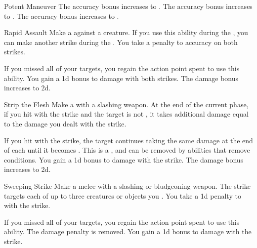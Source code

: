{\begin{ability}{Potent Maneuver}
                \rankline
                 The accuracy bonus increases to .
                 The accuracy bonus increases to .
                 The accuracy bonus increases to .
            \end{ability}

            \begin{ability}{Rapid Assault}
                Make a  against a creature.
                If you use this ability during the , you can make another strike during the .
                You take a  penalty to accuracy on both strikes.

                \rankline
                 If you missed all of your targets, you regain the action point spent to use this ability.
                 You gain a \plus1d bonus to damage with both strikes.
                 The damage bonus increases to \plus2d.
            \end{ability}

            \begin{ability}{Strip the Flesh}
                Make a  with a slashing weapon.
                At the end of the current phase, if you hit with the strike and the target is not , it takes additional damage equal to the damage you dealt with the strike.

                \rankline
                 If you hit with the strike, the target continues taking the same damage at the end of each  until it becomes .
                This is a , and can be removed by abilities that remove conditions.
                 You gain a \plus1d bonus to damage with the strike.
                 The damage bonus increases to \plus2d.
            \end{ability}

            \begin{ability}{Sweeping Strike}
                Make a melee  with a slashing or bludgeoning weapon.
                The strike targets each of up to three creatures or objects you .
                You take a \minus1d penalty to  with the strike.

                \rankline
                 If you missed all of your targets, you regain the action point spent to use this ability.
                 The damage penalty is removed.
                 You gain a \plus1d bonus to damage with the strike.
            \end{ability}
        }

